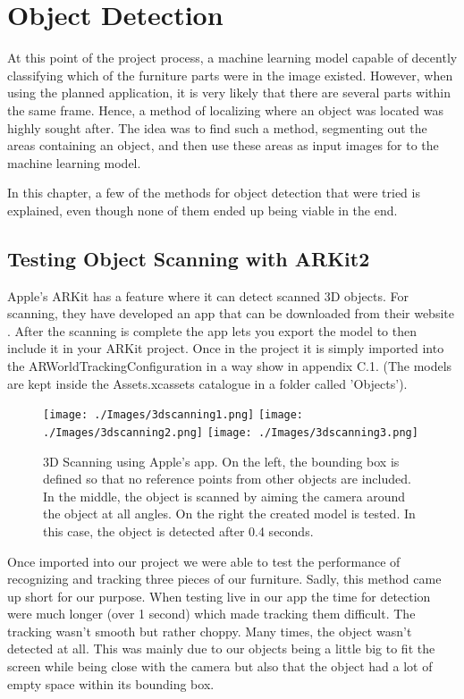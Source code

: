 \chapter{Object Detection}
At this point of the project process, a machine learning model capable of decently 
classifying which of the furniture parts were in the image existed. However, when using the 
planned application, it is very likely that there are several parts within the same frame. 
Hence, a method of localizing where an object was located was highly sought after. The idea 
was to find such a method, segmenting out the areas containing an object, and then use these  
areas as input images for to the machine learning model.

In this chapter, a few of the methods for object detection that were tried is explained, even though none of them ended up being viable in the end.
  
\section{Testing Object Scanning with ARKit2}
\label{sec:ODscanning}
Apple's ARKit has a feature where it can detect scanned 3D objects. For scanning, they have developed an app that can be downloaded from their website \cite{ARScanning}. 
After the scanning is complete the app lets you export the model to then include it in your ARKit project. Once in the project it is simply imported into the ARWorldTrackingConfiguration in a way show in appendix C.1. (The models are kept inside the Assets.xcassets catalogue in a folder called 'Objects').


\begin{figure}[hbtp]
\begin{center}
\texttt{[image: ./Images/3dscanning1.png]}
\texttt{[image: ./Images/3dscanning2.png]}
\texttt{[image: ./Images/3dscanning3.png]} 
\caption{3D Scanning using Apple's app. On the left, the bounding box is defined so that no reference points from other objects are included. In the middle, the object is scanned by aiming the camera around the object at all angles. On the right the created model is tested. In this case, the object is detected after 0.4 seconds.}
\end{center}
\end{figure}

Once imported into our project we were able to test the performance of recognizing and tracking three pieces of our furniture.
Sadly, this method came up short for our purpose. When testing live in our app the time for detection were much longer (over 1 second) which made tracking them difficult. The tracking wasn't smooth but rather choppy. Many times, the object wasn't detected at all. This was mainly due to our objects being a little big to fit the screen while being close with the camera but also that the object had a lot of empty space within its bounding box.

